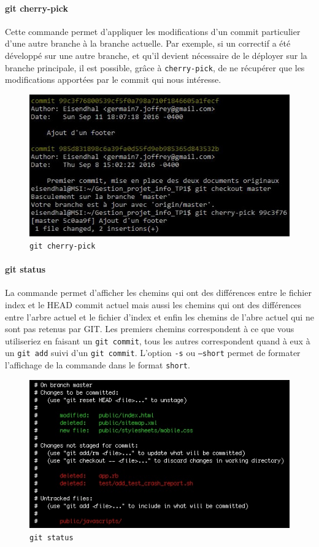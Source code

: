 \documentclass[11pt,canadien]{article}
\begin{document}
\paragraph{git cherry-pick}Cette commande permet d'appliquer les modifications d'un commit particulier d'une autre branche à la branche actuelle. Par exemple, si un correctif a été développé sur une autre branche, et qu'il devient nécessaire de le déployer sur la branche principale, il est possible, grâce à \texttt{cherry-pick}, de ne récupérer que les modifications apportées par le commit qui nous intéresse.
\begin{figure}[h]
	\centering
	\includegraphics[width=\textwidth]{images/git_cherry-pick.jpg}
	\caption{\texttt{git cherry-pick}}
	\label{fig:git_cherry-pick}
\end{figure}

\paragraph{git status}La commande permet d'afficher les chemins qui ont des différences entre le fichier index et le HEAD commit actuel mais aussi les chemins qui ont des différences entre l'arbre actuel et le fichier d'index et enfin les chemins de l'abre actuel qui ne sont pas retenus par GIT. Les premiers chemins correspondent à ce que vous utiliseriez en faisant un \texttt{git commit}, tous les autres correspondent quand à eux à un \texttt{git add} suivi d'un \texttt{git commit}. L'option \texttt{-s} ou \texttt{--short} permet de formater l'affichage de la commande dans le format \texttt{short}.
\begin{figure}[h]
	\centering
	\includegraphics[width=\textwidth]{images/git_status.jpg}
	\caption{\texttt{git status}}
	\label{fig:git_status}
\end{figure}
\end{document}
